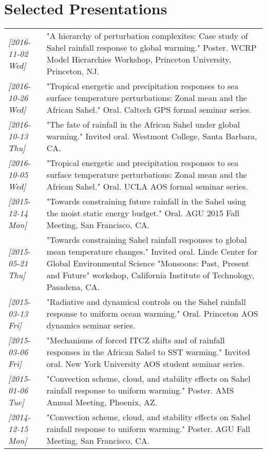 \documentclass{article}
\begin{document}
\section*{Selected Presentations}
\label{sec:orgheadline21}
\begin{center}
\begin{tabularx}{\textwidth}{lX}
\textit{[2016-11-02 Wed]} & "A hierarchy of perturbation complexites: Case study of Sahel rainfall response to global warming."  Poster.  WCRP Model Hierarchies Workshop, Princeton University, Princeton, NJ.\\
\textit{[2016-10-26 Wed]} & "Tropical energetic and precipitation responses to sea surface temperature perturbations: Zonal mean and the African Sahel."  Oral.  Caltech GPS formal seminar series.\\
\textit{[2016-10-13 Thu]} & "The fate of rainfall in the African Sahel under global warming."  Invited oral.  Westmont College, Santa Barbara, CA.\\
\textit{[2016-10-05 Wed]} & "Tropical energetic and precipitation responses to sea surface temperature perturbations: Zonal mean and the African Sahel."  Oral.  UCLA AOS formal seminar series.\\
\textit{[2015-12-14 Mon]} & "Towards constraining future rainfall in the Sahel using the moist static energy budget." Oral.  AGU 2015 Fall Meeting, San Francisco, CA.\\
\textit{[2015-05-21 Thu]} & "Towards constraining Sahel rainfall responses to global mean temperature changes."  Invited oral.  Linde Center for Global Environmental Science "Monsoons: Past, Present and Future" workshop, California Institute of Technology, Pasadena, CA.\\
\textit{[2015-03-13 Fri]} & "Radiative and dynamical controls on the Sahel rainfall response to uniform ocean warming."  Oral.  Princeton AOS dynamics seminar series.\\
\textit{[2015-03-06 Fri]} & "Mechanisms of forced ITCZ shifts and of rainfall responses in the African Sahel to SST warming."  Invited oral.  New York University AOS student seminar series.\\
\textit{[2015-01-06 Tue]} & "Convection scheme, cloud, and stability effects on Sahel rainfall response to uniform warming."  Poster.  AMS Annual Meeting, Phoenix, AZ.\\
\textit{[2014-12-15 Mon]} & "Convection scheme, cloud, and stability effects on Sahel rainfall response to uniform warming."  Poster.  AGU Fall Meeting, San Francisco, CA.\\

\end{tabularx}
\end{center}
\end{document}

